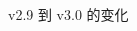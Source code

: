 \begin{frame}
\begin{figure}
\begin{columns}[c]
\begin{column}{0.3\textwidth}
      \end{column}
      \begin{column}{0.26\textwidth}
      \end{column}
      \hfill\hfill
    \end{columns}
    \caption{\SJTUBeamer{} v2.9 到 v3.0 的变化}
  \end{figure}
\end{frame}

